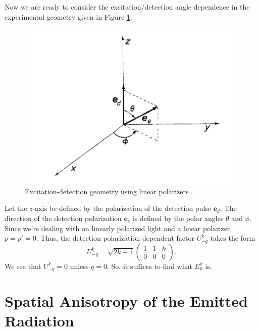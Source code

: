 \documentclass[11pt]{article}
\newcommand{\tj}[6]{ \begin{pmatrix}
		#1 & #2 & #3 \\
		#4 & #5 & #6 
\end{pmatrix}}
\begin{document}
Now we are ready to consider the excitation/detection angle dependence in the experimental geometry given in Figure \ref{fig:scheme1}.
\begin{figure}[!htb]
	\centering
	\includegraphics[scale=0.7]{beats_1}
	\caption{ Excitation-detection geometry using linear polarizers \cite{Luypaert_1977}.}
	\label{fig:scheme1}
\end{figure}
Let the $z$-axis be defined by the polarization of the detection pulse $\mathbf{e}_d$. The direction of the detection polarization $\mathbf{e}_e$ is defined by the polar angles $\theta$ and $\phi$. Since we're dealing with on linearly polarized light and a linear polarizer, $p = p' = 0$. Thus, the detection-polarization dependent factor $U^k_{-q}$ takes the form
\begin{equation*}
U^k_{-q} = \sqrt{2k+1}\tj{1}{1}{k}{0}{0}{0}.
\end{equation*} 
We see that $U^k_{-q} = 0$ unless $q = 0$. So, it suffices to find what $E^k_0$ is. 











\section{Spatial Anisotropy of the Emitted Radiation}
\end{document}
